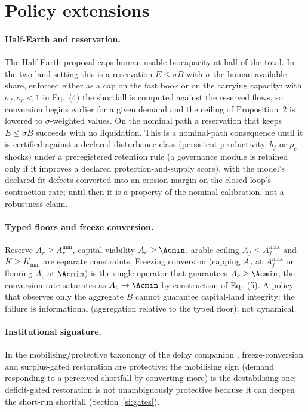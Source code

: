 \section{Policy extensions}\label{si:policy}

\paragraph{Half-Earth and reservation.} The Half-Earth proposal \citep{Wilson2016} caps human-usable biocapacity at half of the total. In the two-land setting this is a reservation $E\le\sigma B$ with $\sigma$ the human-available share, enforced either as a cap on the fast book or on the carrying capacity; with $\sigma_f,\sigma_c<1$ in Eq.~(4) the shortfall is computed against the reserved flows, so conversion begins earlier for a given demand and the ceiling of Proposition~2 is lowered to $\sigma$-weighted values. On the nominal path a reservation that keeps $E\le\sigma B$ succeeds with no liquidation. This is a nominal-path consequence until it is certified against a declared disturbance class (persistent productivity, $b_f$ or $\rho_c$ shocks) under a preregistered retention rule (a governance module is retained only if it improves a declared protection-and-supply score), with the model's declared fit defects converted into an erosion margin on the closed loop's contraction rate; until then it is a property of the nominal calibration, not a robustness claim.

\paragraph{Typed floors and freeze conversion.} Reserve $A_r\ge A_r^{\min}$, capital viability $A_c\ge\Acmin$, arable ceiling $A_f\le A_f^{\max}$ and $K\ge K_{\min}$ are separate constraints. Freezing conversion (capping $A_f$ at $A_f^{\max}$ or flooring $A_c$ at $\Acmin$) is the single operator that guarantees $A_c\ge\Acmin$; the conversion rate saturates as $A_c\to\Acmin$ by construction of Eq.~(5). A policy that observes only the aggregate $B$ cannot guarantee capital-land integrity: the failure is informational (aggregation relative to the typed floor), not dynamical.

\paragraph{Institutional signature.} In the mobilising/protective taxonomy of the delay companion \citep{Abaee2026a}, freeze-conversion and surplus-gated restoration are protective; the mobilising sign (demand responding to a perceived shortfall by converting more) is the destabilising one; deficit-gated restoration is not unambiguously protective because it can deepen the short-run shortfall (Section~\ref{si:gates}).

